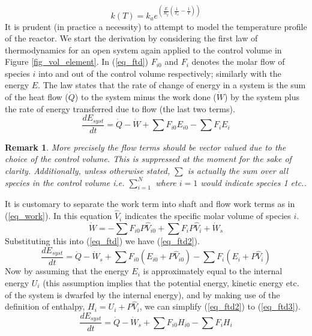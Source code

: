 \documentclass[11pt,fleqn]{article}
\theoremstyle{defstyle}
\newtheorem{rmrk}{Remark}[section]
\begin{document}
\begin{equation}
k(T) = k_a e^{\left(\frac{E}{R_g}\left(\frac{1}{T_a} - \frac{1}{T}\right)\right)}
\label{eq_arrhenius}
\end{equation} 
It is prudent (in practice a necessity) to attempt to model the temperature profile of the reactor. We start the derivation by considering the first law of thermodynamics for an open system again applied to the control volume in Figure \ref{fig_vol_element}. In (\ref{eq_ftd}) $F_{i0}$ and $F_{i}$ denotes the molar flow of species $i$ into and out of the control volume respectively; similarly with the energy $E$. The law states that the rate of change of energy in a system is the sum of the heat flow ($\dot{Q}$) to the system minus the work done ($\dot{W}$) by the system plus the rate of energy transferred due to flow (the last two terms). 
\begin{equation}
\frac{d E_{syst}}{dt} = \dot{Q} - \dot{W} + \sum F_{i0}E_{i0} -\sum F_{i}E_{i}
\label{eq_ftd}
\end{equation}
\begin{rmrk}
More precisely the flow terms should be vector valued due to the choice of the control volume. This is suppressed at the moment for the sake of clarity. Additionally, unless otherwise stated, $\sum$ is actually the sum over all species in the control volume i.e. $\sum_{i=1}^{N}$ where $i=1$ would indicate species 1 etc.. 
\end{rmrk}
It is customary to separate the work term into shaft and flow work terms as in (\ref{eq_work}). In this equation $\hat{V}_i$ indicates the specific molar volume of species $i$.
\begin{equation}
\dot{W} = -\sum F_{i0}P\hat{V}_{i0} + \sum F_{i}P\hat{V}_{i} + \dot{W}_s
\label{eq_work} 
\end{equation}
Substituting this into (\ref{eq_ftd}) we have (\ref{eq_ftd2}).
\begin{equation}
\frac{d E_{syst}}{dt} = \dot{Q} - \dot{W}_s + \sum F_{i0}(E_{i0}+P\hat{V}_{i0}) -\sum F_{i}(E_{i}+P\hat{V}_{i})
\label{eq_ftd2}
\end{equation}
Now by assuming that the energy $E_i$ is approximately equal to the internal energy $U_i$ (this assumption implies that the potential energy, kinetic energy etc. of the system is dwarfed by the internal energy), and by making use of the definition of enthalpy, $H_i = U_i + P\hat{V}_i$, we can simplify (\ref{eq_ftd2}) to (\ref{eq_ftd3}).
\begin{equation}
\frac{d E_{syst}}{dt} = \dot{Q} - \dot{W}_s + \sum F_{i0}H_{i0} -\sum F_{i}H_{i}
\label{eq_ftd3}
\end{equation} 
\end{document}

